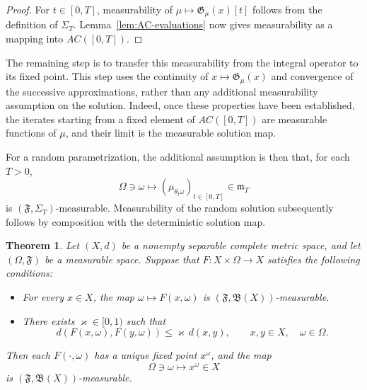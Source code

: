\documentclass[reqno]{amsart}
\theoremstyle{plain}
\newtheorem{theorem}{Theorem}[section]
\numberwithin{equation}{section}
\numberwithin{definition}{section}
\begin{document}
{\begin{proof}
For $t\in[0,T]$, measurability of
$\mu\mapsto \mathfrak G_{\mu} (x)[t]$ follows from the definition
of $\Sigma_T$.
Lemma~\ref{lem:AC-evaluations} now gives measurability
as a mapping into $AC([0,T])$.
\end{proof}

The remaining step is to transfer this measurability
from the integral operator to its fixed point.
This step uses the continuity of $x\mapsto \mathfrak G_{\mu} (x)$
and convergence of the successive approximations,
rather than any additional measurability assumption
on the solution. Indeed, once these properties have been established,
the iterates starting from a fixed element of $AC([0,T])$
are measurable functions of $\mu$, and their limit
is the measurable solution map.

For a random parametrization, the additional assumption
is then that, for each $T>0$,
\begin{equation*}
    \Omega\ni\omega
    \mapsto
    (\mu_{\theta_t\omega})_{t\in[0,T]}
    \in\mathfrak m_T
\end{equation*}
is $(\mathfrak F,\Sigma_T)$-measurable.
Measurability of the random solution subsequently follows
by composition with the deterministic solution map.


\begin{theorem}\label{thrm:mesur-fix}
Let $(X,d)$ be a nonempty separable complete metric space,
and let $(\Omega,\mathfrak F)$ be a measurable space.
Suppose that $F:X\times\Omega\to X$ satisfies the following
conditions:
\begin{itemize}
    \item For every $x\in X$, the map
    $\omega\mapsto F(x,\omega)$ is
    $(\mathfrak F,\mathfrak B(X))$-measurable.
    \item There exists $\varkappa\in[0,1)$ such that
    \begin{equation*}
        d(F(x,\omega),F(y,\omega))
        \leq \varkappa\,d(x,y),
        \qquad x,y\in X,\quad \omega\in\Omega.
    \end{equation*}
\end{itemize}
Then each $F(\cdot,\omega)$ has a unique fixed point
$x^{\omega}$, and the map
\begin{equation*}
    \Omega\ni\omega\mapsto x^{\omega}\in X
\end{equation*}
is $(\mathfrak F,\mathfrak B(X))$-measurable.
\end{theorem}


}
\end{document}
